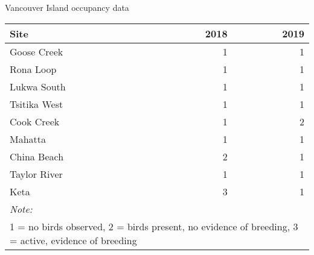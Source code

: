 \documentclass[]{article}
\begin{document}
\begin{capctable}

\caption{\label{tab:unnamed-chunk-9}Vancouver Island occupancy data}
\centering
\begin{tabular}[t]{lrr}
\toprule
Site & 2018 &  2019\\
\midrule
\rowcolor{gray!6}  Goose Creek & 1 & 1\\
Rona Loop & 1 & 1\\
\rowcolor{gray!6}  Lukwa South & 1 & 1\\
Tsitika West & 1 & 1\\
\rowcolor{gray!6}  Cook Creek & 1 & 2\\
\addlinespace
Mahatta & 1 & 1\\
\rowcolor{gray!6}  China Beach & 2 & 1\\
Taylor River & 1 & 1\\
\rowcolor{gray!6}  Keta & 3 & 1\\
\bottomrule
\multicolumn{3}{l}{\textit{Note: }}\\
\multicolumn{3}{l}{1 = no birds observed, 2 = birds present, no evidence of breeding, 3 = active, evidence of breeding}\\
\end{tabular}
\end{capctable}
\end{document}
